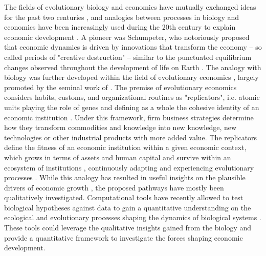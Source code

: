   The fields of evolutionary biology and economics have mutually exchanged ideas for the past two centuries \cite{Dopfer2007}, and analogies between processes in biology and economics have been increasingly used during the 20th century to explain economic development \cite{Ruth1996}.
  A pioneer was Schumpeter, who notoriously proposed that economic dynamics is driven by innovations that transform the economy -- so called periods of "creative destruction" \cite{schumpeter2017theory}-- similar to the punctuated equilibrium changes observed throughout the development of life on Earth \cite{gould1972}.
  The analogy with biology was further developed within the field of evolutionary economics \cite{Hodgson2019}, largely promoted by the seminal work of \cite{nelson1985evolutionary}.
  The premise of evolutionary economics considers habits, customs, and organizational routines as "replicators", i.e. atomic units playing the role of genes and defining as a whole the cohesive identity of an economic institution \cite{Hodgson2019}.
  Under this framework, firm business strategies determine how they transform commodities and knowledge into new knowledge, new technologies or other industrial products with more added value.
  The replicators define the fitness of an economic institution within a given economic context, which grows in terms of assets and human capital and survive within an ecosystem of institutions \cite{Hodgson2002}, continuously adapting and experiencing evolutionary processes \cite{Veblen1898}.
  While this analogy has resulted in useful insights on the plausible drivers of economic growth \cite{Dopfer2007}, the proposed pathways have mostly been qualitatively investigated.
  Computational tools have recently allowed to test biological hypotheses against data to gain a quantitative understanding on the ecological and evolutionary processes shaping the dynamics of biological systems \cite{Pontarp2019,Boussange2022,Boussange2022a}. These tools could leverage the qualitative insights gained from the biology and provide a quantitative framework to investigate the forces shaping economic development.
  
